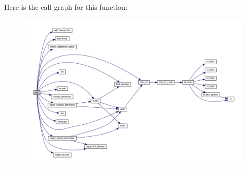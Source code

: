 Here is the call graph for this function\+:
\nopagebreak
\begin{figure}[H]
\begin{center}
\leavevmode
\includegraphics[width=350pt]{d9/dda/limesuite-dev_2src_2CMakeLists_8txt_ab2c8ff3a733b842948dbd66addba266b_cgraph}
\end{center}
\end{figure}


